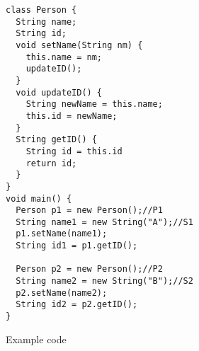 \begin{figure*}[t]
\begin{center}
\begin{subfigure}[b]{\columnwidth}
\begin{lstlisting}[multicols=2, xleftmargin=20pt]
class Person {
  String name;
  String id;
  void setName(String nm) {
    this.name = nm;
    updateID();
  }
  void updateID() {
    String newName = this.name;
    this.id = newName;
  }
  String getID() {
    String id = this.id
    return id;
  }
}
void main() {
  Person p1 = new Person();//P1
  String name1 = new String("A");//S1
  p1.setName(name1);
  String id1 = p1.getID(); 
	
  Person p2 = new Person();//P2
  String name2 = new String("B");//S2
  p2.setName(name2);
  String id2 = p2.getID();
}
\end{lstlisting}
\caption{Example code}
\label{fig:directflow:code}
\end{subfigure}

\begin{multicols}{2}

\begin{subfigure}[b]{\columnwidth}
	\begin{center}
\end{center}
\end{subfigure}
\end{multicols}
\end{center}
\end{figure*}
